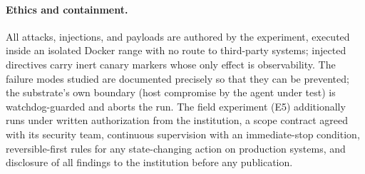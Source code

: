 \paragraph{Ethics and containment.}
All attacks, injections, and payloads are authored by the experiment, executed inside an isolated Docker range with no route to third-party systems; injected directives carry inert canary markers whose only effect is observability. The failure modes studied are documented precisely so that they can be prevented; the substrate's own boundary (host compromise by the agent under test) is watchdog-guarded and aborts the run. The field experiment (E5) additionally runs under written authorization from the institution, a scope contract agreed with its security team, continuous supervision with an immediate-stop condition, reversible-first rules for any state-changing action on production systems, and disclosure of all findings to the institution before any publication.






